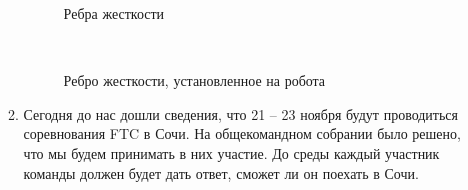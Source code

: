 \begin{enumerate}
\begin{enumerate}
      \begin{figure}[H]
      	\begin{minipage}[h]{0.47\linewidth}
      		\caption{Ребра жесткости}  
      	\end{minipage}
      	\hfill
      	\begin{minipage}[h]{0.47\linewidth}
      		\caption{Ребро жесткости, установленное на робота}
      	\end{minipage}
      \end{figure}
      
      \item Сегодня до нас дошли сведения, что 21 – 23 ноября будут проводиться соревнования FTC в Сочи. На общекомандном собрании было решено, что мы будем принимать в них участие. До среды каждый участник команды должен будет дать ответ, сможет ли он поехать в Сочи.
      

\end{enumerate}
\end{enumerate}
